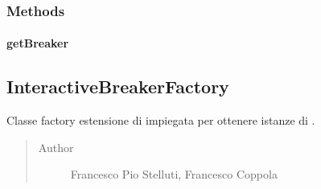 \documentclass[letterpaper,10pt,italian,openany,oneside]{sphinxmanual}
\begin{document}
\subsubsection{Methods}
\label{\detokenize{source/it/unicam/cs/pa/mastermind/factories/BreakerFactory:methods}}

\paragraph{getBreaker}
\label{\detokenize{source/it/unicam/cs/pa/mastermind/factories/BreakerFactory:getbreaker}}

\begin{fulllineitems}
\label{\detokenize{source/it/unicam/cs/pa/mastermind/factories/BreakerFactory:it.unicam.cs.pa.mastermind.factories.BreakerFactory.getBreaker()}}
\end{fulllineitems}



\subsection{InteractiveBreakerFactory}
\label{\detokenize{source/it/unicam/cs/pa/mastermind/factories/InteractiveBreakerFactory:interactivebreakerfactory}}\label{\detokenize{source/it/unicam/cs/pa/mastermind/factories/InteractiveBreakerFactory::doc}}

\begin{fulllineitems}
\label{\detokenize{source/it/unicam/cs/pa/mastermind/factories/InteractiveBreakerFactory:it.unicam.cs.pa.mastermind.factories.InteractiveBreakerFactory}}
Classe factory estensione di  impiegata per ottenere istanze di .
\begin{quote}\begin{description}
\item[{Author}] \leavevmode
Francesco Pio Stelluti, Francesco Coppola

\end{description}\end{quote}

\end{fulllineitems}
\end{document}
